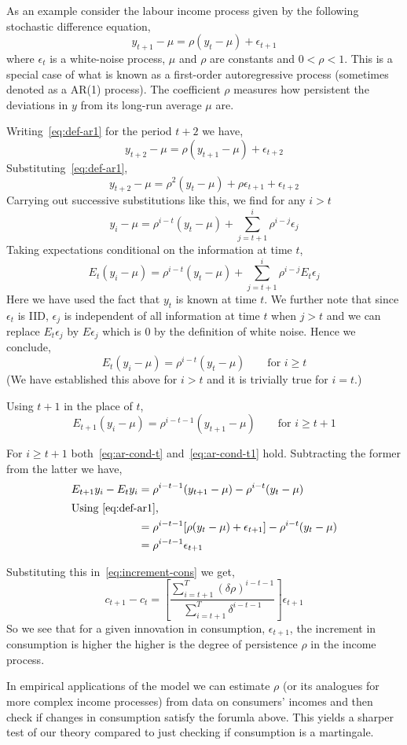 \documentclass[12pt,reqno,openany]{amsbook}
\theoremstyle{plain}
\theoremstyle{definition}
\begin{document}
As an example consider the labour income process given by the
following stochastic difference equation,
\begin{equation}\label{eq:def-ar1}
y_{t+1}-\mu=\rho(y_t-\mu)+\epsilon_{t+1}
\end{equation}
where $\epsilon_t$ is a white-noise process, $\mu$ and $\rho$ are
constants and $0 < \rho <1$. This is a special case of what is known
as a first-order autoregressive process (sometimes denoted as a AR(1)
process). The coefficient $\rho$ measures how persistent the
deviations in $y$ from its long-run average $\mu$ are.

Writing~\eqref{eq:def-ar1} for the period $t+2$ we have,
\[y_{t+2}-\mu=\rho(y_{t+1}-\mu)+\epsilon_{t+2}\]
Substituting~\eqref{eq:def-ar1},
\[y_{t+2}-\mu=\rho^2(y_t-\mu)+\rho\epsilon_{t+1}+\epsilon_{t+2}\]
Carrying out successive substitutions like this, we find for any
$i>t$
\[y_i-\mu = \rho^{i-t}(y_t-\mu)+\sum_{j=t+1}^i \rho^{i-j} \epsilon_j\]
Taking expectations conditional on the information at time $t$,
\[E_t(y_i-\mu) = \rho^{i-t}(y_t-\mu)+\sum_{j=t+1}^i \rho^{i-j}
E_t\epsilon_j\]
Here we have used the fact that $y_t$ is known at time $t$. We
further note that since $\epsilon_t$ is IID, $\epsilon_j$ is
independent of all information at time $t$ when $j>t$ and we can
replace $E_t \epsilon_j$ by $E \epsilon_j$ which is $0$ by the
definition of white noise. Hence we conclude,
\begin{equation}\label{eq:ar-cond-t}
E_t(y_i-\mu) = \rho^{i-t}(y_t-\mu) \qquad \text{for $i \geq t$}
\end{equation}
(We have established this above for $i>t$ and it is trivially true for
$i=t$.)

Using $t+1$ in the place of $t$,
\begin{equation}\label{eq:ar-cond-t1}
E_{t+1}(y_i-\mu) = \rho^{i-t-1}(y_{t+1}-\mu) \qquad \text{for $i \geq t+1$}
\end{equation}

For $i\geq t+1$ both~\eqref{eq:ar-cond-t} and~\eqref{eq:ar-cond-t1}
hold. Subtracting the former from the latter we have,
\begin{align*}
E_{t+1} y_i - E_t y_i &=
\rho^{i-t-1}(y_{t+1}-\mu)-\rho^{i-t}(y_t-\mu)\\
\intertext{Using~\eqref{eq:def-ar1},}
&=\rho^{i-t-1}[\rho(y_t-\mu)+\epsilon_{t+1}]-\rho^{i-t}(y_t-\mu)\\
&=\rho^{i-t-1}\epsilon_{t+1}
\end{align*}

Substituting this in~\eqref{eq:increment-cons} we get,
\[c_{t+1}-c_t=\left[\frac{\sum_{i=t+1}^T(\delta\rho)^{i-t-1}}
{\sum_{i=t+1}^T \delta^{i-t-1}}\right]\epsilon_{t+1}\]
So we see that for a given innovation in consumption,
$\epsilon_{t+1}$, the increment in consumption is higher the higher is
the degree of persistence $\rho$ in the income process.

In empirical applications of the model we can estimate $\rho$ (or its
analogues for more complex income processes) from
data on consumers' incomes  and then check if changes in consumption
satisfy the forumla above. This yields a sharper test of our theory
compared to just checking if consumption is a martingale.
\end{document}
